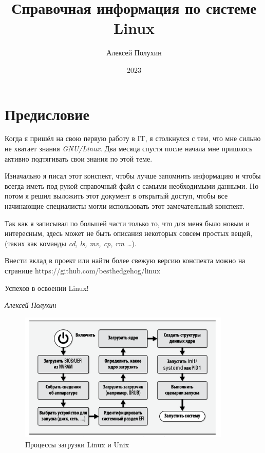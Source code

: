 \documentclass[oneside, final, 14pt]{extreport} %
\title{Справочная информация по системе Linux}
\author{Алексей Полухин}
\date{2023}
\begin{document}
\begin{titlepage}
    \maketitle
\end{titlepage}


\tableofcontents %
\newpage

\section*{Предисловие}
Когда я пришёл на свою первую работу в IT, я столкнулся с тем, что мне 
сильно не хватает знания \textit{GNU/Linux}. Два месяца спустя после начала
мне пришлось активно подтягивать свои знания по этой теме. 

Изначально я писал этот конспект, чтобы лучше запомнить информацию и чтобы всегда иметь 
под рукой справочный файл с самыми необходимыми данными. Но потом я решил выложить этот документ
в открытый доступ, чтобы все начинающие специалисты могли использовать этот замечательный конспект.

Так как я записывал по большей части только то, что для меня было новым и интересным, здесь может не быть описания 
некоторых совсем простых вещей, (таких как команды \textit{cd, ls, mv, cp, rm \dots}).

Внести вклад в проект или найти более свежую версию конспекта можно на странице https://github.com/besthedgehog/linux



\vspace*{\baselineskip}

\begin{flushright}
    Успехов в освоении Linux! 

    \vspace*{\baselineskip}

    \textit{Алексей Полухин}
\end{flushright}

\newpage

\begin{figure}[ht]
    \centering
    \includegraphics[width=0.9\textwidth]{1.png}
    \caption{Процессы загрузки Linux и Unix}
    \label{fig:1}
\end{figure}
\end{document}
